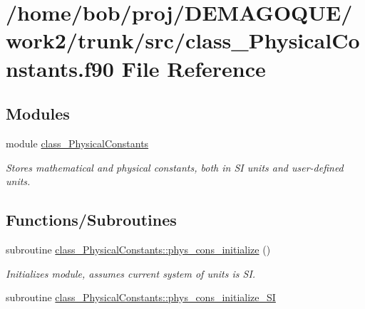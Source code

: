 \hypertarget{class__PhysicalConstants_8f90}{
\section{/home/bob/proj/DEMAGOQUE/work2/trunk/src/class\_\-PhysicalConstants.f90 File Reference}
\label{class__PhysicalConstants_8f90}
}
\subsection*{Modules}
\begin{DoxyCompactItemize}
\item 
module \hyperlink{namespaceclass__PhysicalConstants}{class\_\-PhysicalConstants}


\begin{DoxyCompactList}\small\item\em Stores mathematical and physical constants, both in SI units and user-\/defined units. \item\end{DoxyCompactList}

\end{DoxyCompactItemize}
\subsection*{Functions/Subroutines}
\begin{DoxyCompactItemize}
\item 
subroutine \hyperlink{namespaceclass__PhysicalConstants_a12646466fa3b6eb776e5be6f53b5eb5b}{class\_\-PhysicalConstants::phys\_\-cons\_\-initialize} ()
\begin{DoxyCompactList}\small\item\em Initializes module, assumes current system of units is SI. \item\end{DoxyCompactList}\item 
subroutine \hyperlink{namespaceclass__PhysicalConstants_a60f39db2f3075d17f5e1b47ed02ad092}{class\_\-PhysicalConstants::phys\_\-cons\_\-initialize\_\-SI}
\end{DoxyCompactItemize}
